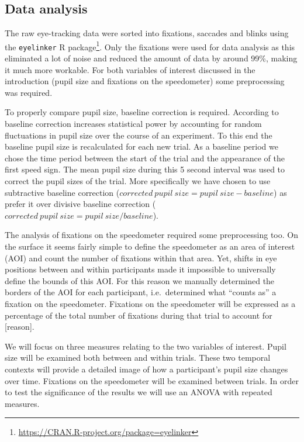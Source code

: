\subsection{Data analysis}
The raw eye-tracking data were sorted into fixations, saccades and blinks using the \texttt{eyelinker} R package\footnote{\url{https://CRAN.R-project.org/package=eyelinker}}.
Only the fixations were used for data analysis as this eliminated a lot of noise and reduced the amount of data by around 99\%, making it much more workable.
For both variables of interest discussed in the introduction (pupil size and fixations on the speedometer) some preprocessing was required.

To properly compare pupil size, baseline correction is required. 
According to \citet{Mathot2018} baseline correction increases statistical power by accounting for random fluctuations in pupil size over the course of an experiment.
To this end the baseline pupil size is recalculated for each new trial.
As a baseline period we chose the time period between the start of the trial and the appearance of the first speed sign.
The mean pupil size during this 5 second interval was used to correct the pupil sizes of the trial.
More specifically we have chosen to use subtractive baseline correction (\(corrected\ pupil\ size = pupil\ size - baseline\)) 
as \citet{Mathot2018} prefer it over divisive baseline correction (\(corrected\ pupil\ size = pupil\ size / baseline\)).

The analysis of fixations on the speedometer required some preprocessing too.
On the surface it seems fairly simple to define the speedometer as an area of interest (AOI) and count the number of fixations within that area.
Yet, shifts in eye positions between and within participants made it impossible to universally define the bounds of this AOI.\@
For this reason we manually determined the borders of the AOI for each participant, i.e.\ determined what ``counts as'' a fixation on the speedometer.
Fixations on the speedometer will be expressed as a percentage of the total number of fixations during that trial to account for [reason].

We will focus on three measures relating to the two variables of interest. 
Pupil size will be examined both between and within trials.
These two temporal contexts will provide a detailed image of how a participant's pupil size changes over time.
Fixations on the speedometer will be examined between trials. 
In order to test the significance of the results we will use an ANOVA with repeated measures.

